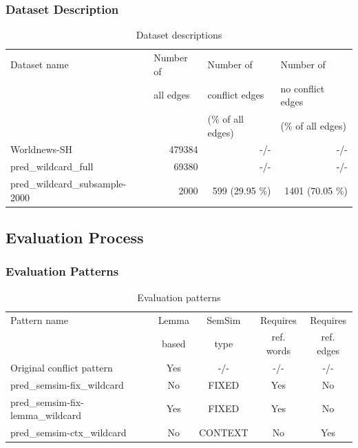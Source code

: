 \documentclass[11pt]{scrreprt}
\begin{document}

\subsubsection{Dataset Description}


\begin{table}
\begin{tabular}{lrrr}
\toprule
\multicolumn{1}{l}{Dataset name}		& \multicolumn{1}{l}{Number of} 		& \multicolumn{1}{l}{Number of} 		& \multicolumn{1}{l}{Number of} \\
\multicolumn{1}{l}{} 				& \multicolumn{1}{l}{all edges} 		& \multicolumn{1}{l}{conflict edges} 	& \multicolumn{1}{l}{no conflict edges} \\
\multicolumn{1}{l}{} 				& \multicolumn{1}{l}{} 				& \multicolumn{1}{l}{(\% of all edges)} & \multicolumn{1}{l}{(\% of all edges)} \\
\midrule
Worldnews-SH						& 479384		& -/-				& -/- \\
pred\_wildcard\_full				& 69380 		& -/- 				& -/- \\
pred\_wildcard\_subsample-2000		& 2000 		& 599 (29.95 \%) 	& 1401 (70.05 \%) \\
\bottomrule
\end{tabular}
\caption{Dataset descriptions}
\label{tab:dataset-descriptions}
\end{table}


\subsection{Evaluation Process}


\subsubsection{Evaluation Patterns}

\begin{table}
\begin{tabular}{lcccc}
\toprule
\multicolumn{1}{l}{Pattern name}		& \multicolumn{1}{c}{Lemma}		& \multicolumn{1}{c}{SemSim}	& \multicolumn{1}{c}{Requires}		& \multicolumn{1}{c}{Requires} \\
\multicolumn{1}{l}{} 				& \multicolumn{1}{c}{based} 		& \multicolumn{1}{c}{type} 		& \multicolumn{1}{c}{ref. words} 	& \multicolumn{1}{c}{ref. edges} \\
\midrule
Original conflict pattern			& Yes 		& -/- 		& -/-		& -/- \\
pred\_semsim-fix\_wildcard			& No			& FIXED		& Yes		& No \\
pred\_semsim-fix-lemma\_wildcard 	& Yes 		& FIXED		& Yes		& No \\
pred\_semsim-ctx\_wildcard			& No			& CONTEXT	& No			& Yes \\
\bottomrule
\end{tabular}
\caption{Evaluation patterns}
\label{tab:evaluation-patterns}
\end{table}
\end{document}
